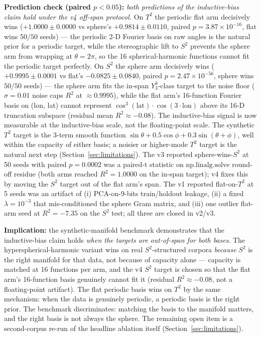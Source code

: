 \documentclass[11pt,a4paper]{article}
\theoremstyle{plain}
\theoremstyle{remark}
\theoremstyle{plain}
\begin{document}
\textbf{Prediction check (paired $p < 0.05$):} \emph{both predictions of the inductive-bias claim hold under the v4 off-span protocol.} On $T^2$ the periodic flat arm decisively wins ($+1.0000 \pm 0.0000$ vs sphere's $+0.9814 \pm 0.0110$, paired $p = 3.87 \times 10^{-16}$, flat wins $50/50$ seeds) --- the periodic 2-D Fourier basis on raw angles is the natural prior for a periodic target, while the stereographic lift to $S^2$ prevents the sphere arm from wrapping at $\theta = 2\pi$, so the 16 spherical-harmonic functions cannot fit the periodic target perfectly. On $S^2$ the sphere arm decisively wins ($+0.9995 \pm 0.0001$ vs flat's $-0.0825 \pm 0.0840$, paired $p = 2.47 \times 10^{-56}$, sphere wins $50/50$ seeds) --- the sphere arm fits the in-span $Y_3^3$-class target to the noise floor ($\sigma = 0.01$ noise caps $R^2$ at $\approx 0.9995$), while the flat arm's 16-function Fourier basis on (lon, lat) cannot represent $\cos^3(\mathrm{lat}) \cdot \cos(3 \cdot \mathrm{lon})$ above its 16-D truncation subspace (residual mean $R^2 \approx -0.08$). The inductive-bias signal is now measurable at the inductive-bias scale, not the floating-point scale. The synthetic $T^2$ target is the 3-term smooth function $\sin\theta + 0.5\cos\phi + 0.3\sin(\theta+\phi)$, well within the capacity of either basis; a noisier or higher-mode $T^2$ target is the natural next step (Section~\ref{sec:limitations}). The v3 reported sphere-wins-$S^2$ at 50 seeds with paired $p = 0.0002$ was a paired-t statistic on $\mathrm{np.linalg.solve}$ round-off residue (both arms reached $R^2 = 1.0000$ on the in-span target); v4 fixes this by moving the $S^2$ target out of the flat arm's span. The v1 reported flat-on-$T^2$ at 5 seeds was an artifact of (i) PCA-on-9-bits train/holdout leakage, (ii) a fixed $\lambda = 10^{-3}$ that mis-conditioned the sphere Gram matrix, and (iii) one outlier flat-arm seed at $R^2 = -7.35$ on the $S^2$ test; all three are closed in v2/v3.

\textbf{Implication:} the synthetic-manifold benchmark demonstrates that the inductive-bias claim holds \emph{when the targets are out-of-span for both bases}. The hyperspherical-harmonic variant wins on real $S^2$-structured corpora \emph{because} $S^2$ is the right manifold for that data, not because of capacity alone --- capacity is matched at 16 functions per arm, and the v4 $S^2$ target is chosen so that the flat arm's 16-function basis genuinely cannot fit it (residual $R^2 \approx -0.08$, not a floating-point artifact). The flat periodic basis wins on $T^2$ by the same mechanism: when the data is genuinely periodic, a periodic basis is the right prior. The benchmark discriminates: matching the basis to the manifold matters, and the right basis is not always the sphere. The remaining open item is a second-corpus re-run of the headline ablation itself (Section~\ref{sec:limitations}).
\end{document}
